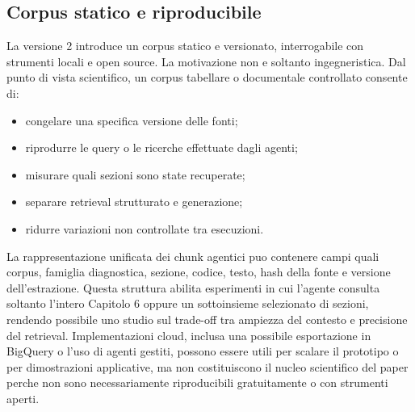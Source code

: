 \documentclass[11pt,a4paper]{article}
\begin{document}
\subsection{Corpus statico e riproducibile}
La versione 2 introduce un corpus statico e versionato, interrogabile con strumenti locali e open source. La motivazione non e soltanto ingegneristica. Dal punto di vista scientifico, un corpus tabellare o documentale controllato consente di:
\begin{itemize}
  \item congelare una specifica versione delle fonti;
  \item riprodurre le query o le ricerche effettuate dagli agenti;
  \item misurare quali sezioni sono state recuperate;
  \item separare retrieval strutturato e generazione;
  \item ridurre variazioni non controllate tra esecuzioni.
\end{itemize}

La rappresentazione unificata dei chunk agentici puo contenere campi quali corpus, famiglia diagnostica, sezione, codice, testo, hash della fonte e versione dell'estrazione. Questa struttura abilita esperimenti in cui l'agente consulta soltanto l'intero Capitolo 6 oppure un sottoinsieme selezionato di sezioni, rendendo possibile uno studio sul trade-off tra ampiezza del contesto e precisione del retrieval. Implementazioni cloud, inclusa una possibile esportazione in BigQuery o l'uso di agenti gestiti, possono essere utili per scalare il prototipo o per dimostrazioni applicative, ma non costituiscono il nucleo scientifico del paper perche non sono necessariamente riproducibili gratuitamente o con strumenti aperti.
\end{document}
